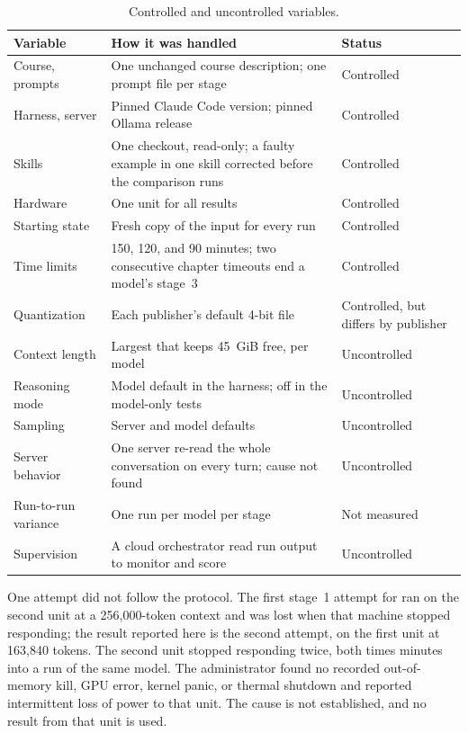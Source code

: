 \begin{table}[htbp]
\centering
\small
\begin{tabularx}{\textwidth}{@{}lXl@{}}
\toprule
\textbf{Variable} & \textbf{How it was handled} & \textbf{Status} \\
\midrule
Course, prompts & One unchanged course description; one prompt file per stage & Controlled \\
Harness, server & Pinned Claude Code version; pinned Ollama release & Controlled \\
Skills & One checkout, read-only; a faulty example in one skill corrected before the comparison runs & Controlled \\
Hardware & One unit for all results & Controlled \\
Starting state & Fresh copy of the input for every run & Controlled \\
Time limits & 150, 120, and 90 minutes; two consecutive chapter timeouts end a model's stage~3 & Controlled \\
Quantization & Each publisher's default 4-bit file & Controlled, but differs by publisher \\
Context length & Largest that keeps 45~GiB free, per model & Uncontrolled \\
Reasoning mode & Model default in the harness; off in the model-only tests & Uncontrolled \\
Sampling & Server and model defaults & Uncontrolled \\
Server behavior & One server re-read the whole conversation on every turn; cause not found & Uncontrolled \\
Run-to-run variance & One run per model per stage & Not measured \\
Supervision & A cloud orchestrator read run output to monitor and score & Uncontrolled \\
\bottomrule
\end{tabularx}
\caption{Controlled and uncontrolled variables.}
\label{tab:controls}
\end{table}

One attempt did not follow the protocol. The first stage~1 attempt for \Gthirtyone{} ran on the second unit at a 256,000-token context and was lost when that machine stopped responding; the result reported here is the second attempt, on the first unit at 163,840 tokens. The second unit stopped responding twice, both times minutes into a run of the same model. The administrator found no recorded out-of-memory kill, GPU error, kernel panic, or thermal shutdown and reported intermittent loss of power to that unit. The cause is not established, and no result from that unit is used.
